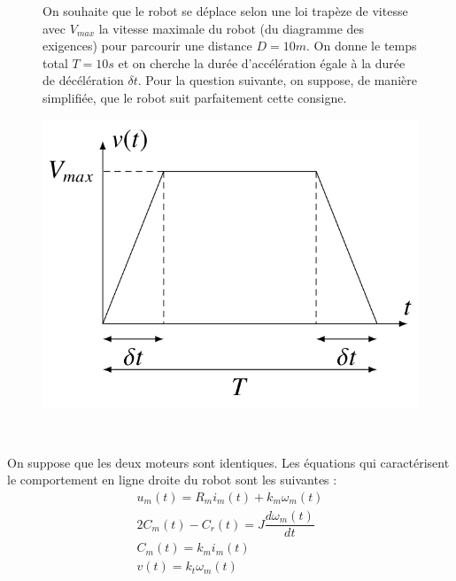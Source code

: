 \begin{figure}[ht!]
\begin{minipage}{0.6\linewidth}
On souhaite que le robot se déplace selon une loi trapèze de vitesse avec $V_{max}$ la vitesse maximale du robot (du diagramme des exigences) pour parcourir une distance
$D=10m$. On donne le temps total $T=10s$ et on cherche la durée d'accélération égale à la durée de décélération $\delta t$. Pour la question suivante, on suppose, de manière simplifiée, que le robot suit parfaitement cette consigne.
\end{minipage}
\hfill
\begin{minipage}{0.36\linewidth}
\begin{center}
 \includegraphics[width=0.9\linewidth]{img/fig04b}
\end{center}
\end{minipage}
\end{figure}


~\

On suppose que les deux moteurs sont identiques. Les équations qui caractérisent le comportement en ligne droite du robot sont les suivantes :
\begin{eqnarray}
u_m(t)=R_mi_m(t)+k_m\omega_m(t)\\
2C_m(t)-C_r(t)=J\dfrac{d\omega_m(t)}{dt}\\
C_m(t)=k_mi_m(t)\\
v(t)=k_t\omega_m(t)
\end{eqnarray}

